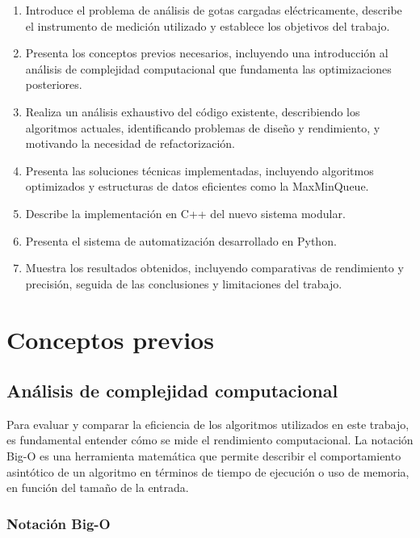 \documentclass[12pt,a4paper]{article}
\begin{document}
\begin{enumerate}
    \item Introduce el problema de análisis de gotas cargadas eléctricamente, describe el instrumento de medición utilizado y establece los objetivos del trabajo.

    \item Presenta los conceptos previos necesarios, incluyendo una introducción al análisis de complejidad computacional que fundamenta las optimizaciones posteriores.

    \item Realiza un análisis exhaustivo del código existente, describiendo los algoritmos actuales, identificando problemas de diseño y rendimiento, y motivando la necesidad de refactorización.

    \item Presenta las soluciones técnicas implementadas, incluyendo algoritmos optimizados y estructuras de datos eficientes como la MaxMinQueue.

    \item Describe la implementación en C++ del nuevo sistema modular.

    \item Presenta el sistema de automatización desarrollado en Python.

    \item Muestra los resultados obtenidos, incluyendo comparativas de rendimiento y precisión, seguida de las conclusiones y limitaciones del trabajo.
\end{enumerate}

\section{Conceptos previos}

\subsection{Análisis de complejidad computacional}
\lhead{}

Para evaluar y comparar la eficiencia de los algoritmos utilizados en este trabajo, es fundamental entender cómo se mide el rendimiento computacional. La notación Big-O es una herramienta matemática que permite describir el comportamiento asintótico de un algoritmo en términos de tiempo de ejecución o uso de memoria, en función del tamaño de la entrada.

\subsubsection{Notación Big-O}
\end{document}
